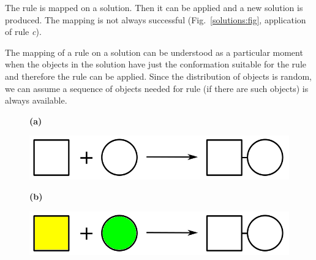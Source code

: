 \documentclass[12pt]{fithesis2}
\begin{document}
The rule is mapped on a solution. Then it can be applied and a new solution is produced. The mapping is not always successful (Fig.~\ref{solutions:fig}, application of rule \textit{c}). %

The mapping of a rule on a solution can be understood as a particular moment when the objects in the solution have just the conformation suitable for the rule and therefore the rule can be applied. Since the distribution of objects is random, we can assume a sequence of objects needed for rule (if there are such objects) is always available.

\begin{figure}[!h]
\begin{center}
\begin{minipage}[l]{0.1\textwidth}
    \textbf{(a)}
  \end{minipage}
  \begin{minipage}[r]{0.6\textwidth}
    {\hspace*{1.3cm}\includegraphics[scale=0.2]{pics/rule_complex}}
\end{minipage}

\begin{minipage}[l]{0.1\textwidth}
    \textbf{(b)}
  \end{minipage}
  \begin{minipage}[r]{0.6\textwidth}
    {\hspace*{1.3cm}\includegraphics[scale=0.2]{pics/rule_complex_mapped}}
\end{minipage}


\end{center}
\end{figure}
\end{document}
